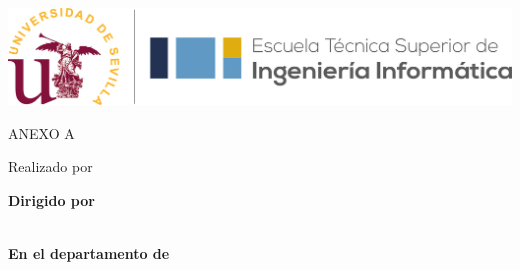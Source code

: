 \thispagestyle{empty} %
\begin{center}

\vspace*{1cm}

\includegraphics[width=\textwidth]{figures/etsii_us.png}

\vspace*{2.5cm}
\begin{large}
ANEXO A
\end{large}

\vspace*{0.1in}
\textbf{\huge \tfgTitle}

\vspace*{.5in}

{\large Realizado por}\\
\textbf{\Large \tfgAuthors}

\vspace*{2cm}


\vspace*{0.2in}

\textbf{Dirigido por}\\
{\large \tfgSupervisor}\\

\vspace*{0.2in}

\textbf{En el departamento de}\\
{\large \tfgDepartment}

\vspace*{.6in}

\end{center}

\ifdefined\tfgDedication
    \newpage
    \thispagestyle{empty}
    
    \vspace*{\fill}
    \begin{center}
    \textit{\tfgDedication}
    \end{center}
    \vspace*{\fill}
\fi

\clearpage\setcounter{page}{1} %
